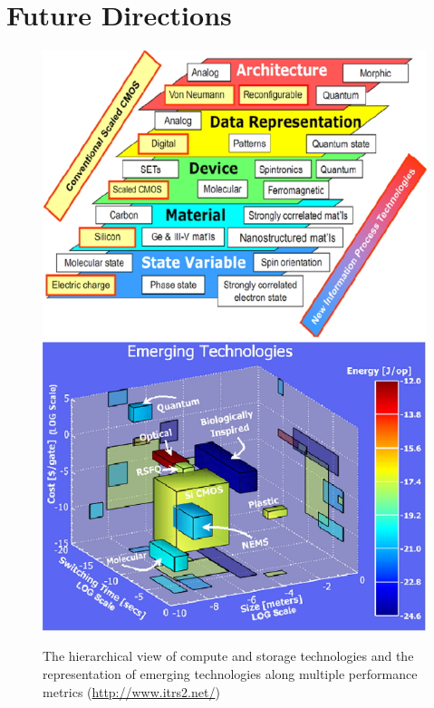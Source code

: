 \section{Future Directions} 
\begin{figure}[H]
\centering
\includegraphics[scale=1.2]{src/Figures/chap1/chap1-fig05a.jpg}\qquad\qquad
\includegraphics[scale=1.2]{src/Figures/chap1/chap1-fig05b.jpg}
\caption{The hierarchical view of compute and storage technologies and the representation of emerging technologies along multiple performance metrics (\url{http://www.itrs2.net/})}\label{chap1-fig5}
\end{figure}

